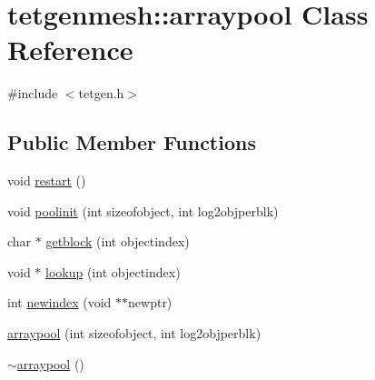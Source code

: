 \hypertarget{classtetgenmesh_1_1arraypool}{}\section{tetgenmesh\+:\+:arraypool Class Reference}
\label{classtetgenmesh_1_1arraypool}


{\ttfamily \#include $<$tetgen.\+h$>$}

\subsection*{Public Member Functions}
\begin{DoxyCompactItemize}
\item 
void \hyperlink{classtetgenmesh_1_1arraypool_a19030126ef81a9ff3c4aca35f0347cdc}{restart} ()
\item 
void \hyperlink{classtetgenmesh_1_1arraypool_a3069be62301a28c1e89201008e838cf8}{poolinit} (int sizeofobject, int log2objperblk)
\item 
char $\ast$ \hyperlink{classtetgenmesh_1_1arraypool_a17e2b92fac4afe65cc14e25f9d42ce6b}{getblock} (int objectindex)
\item 
void $\ast$ \hyperlink{classtetgenmesh_1_1arraypool_a2efe165bb3324f8801f209d1721ff9ec}{lookup} (int objectindex)
\item 
int \hyperlink{classtetgenmesh_1_1arraypool_afb546c70f7728e3e0d58e2aada464437}{newindex} (void $\ast$$\ast$newptr)
\item 
\hyperlink{classtetgenmesh_1_1arraypool_a62a21b86eafefd79c951e85a9b180d0f}{arraypool} (int sizeofobject, int log2objperblk)
\item 
\hyperlink{classtetgenmesh_1_1arraypool_ad35fa12ece8de7d6b567baf9af8d7200}{$\sim$arraypool} ()
\end{DoxyCompactItemize}
